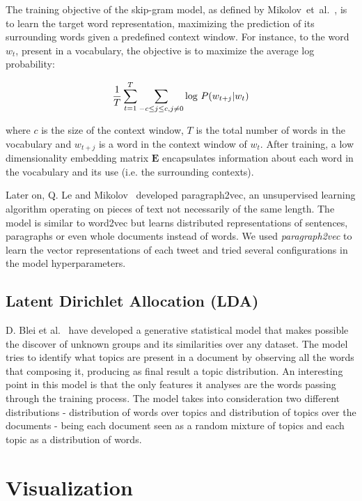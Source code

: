 The training objective of the skip-gram model, as defined by Mikolov~et~al.~\cite{mikolov2013linguistic}, is to learn the target word representation, maximizing the prediction of its surrounding words given a predefined context window. For instance, to the word $w_t$, present in a vocabulary, the objective is to maximize the average log probability:

\begin{equation}
\frac{1}{T}  \sum_{t=1}^{T}  \sum_{-c \leq j \leq  c, j \neq 0} \textnormal{log } P(w_{t+j} | w_t)
\end{equation}

where $c$ is the size of the context window, $T$ is the total number of words in the vocabulary and $w_{t+j}$ is a word in the context window of $w_t$. After training, a low dimensionality embedding matrix $\textbf{E}$ encapsulates information about each word in the vocabulary and its use (i.e. the surrounding contexts).

Later on, Q. Le and Mikolov~\cite{le2014distributed} developed paragraph2vec, an unsupervised learning algorithm operating on pieces of text not necessarily of the same length. The model is similar to word2vec but learns distributed representations of sentences, paragraphs or even whole documents instead of words. We used \emph{paragraph2vec} to learn the vector representations of each tweet and tried several configurations in the model hyperparameters.

\subsection{Latent Dirichlet Allocation (LDA)}
D. Blei et al.~\cite{blei2003latent} have developed a generative statistical model that makes possible the discover of unknown groups and its similarities over any dataset. The model tries to identify what topics are present in a document by observing all the words that composing it, producing as final result a topic distribution. An interesting point in this model is that the only features it analyses are the words passing through the training process. The model takes into consideration two different distributions - distribution of words over topics and distribution of topics over the documents - being each document seen as a random mixture of topics and each topic as a distribution of words.

\section{Visualization}\label{sec:visualization}

